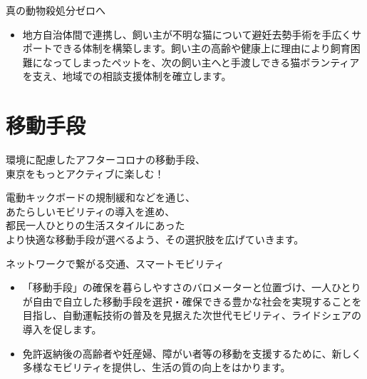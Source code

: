 \documentclass[dvipdfmx]{beamer}
\begin{document}
    \begin{frame}{真の動物殺処分ゼロへ}{}
        \begin{small}
            \begin{itemize}
                \setlength{\itemsep}{2mm}
                \item 地方自治体間で連携し、飼い主が不明な猫について避妊去勢手術を手広くサポートできる体制を構築します。飼い主の高齢や健康上に理由により飼育困難になってしまったペットを、次の飼い主へと手渡しできる猫ボランティアを支え、地域での相談支援体制を確立します。
            \end{itemize}
        \end{small}
    \end{frame}

\section{移動手段}
    \begin{frame}
        \sectionpage
        \begin{center}
            \begin{large}
                \alert{環境に配慮したアフターコロナの移動手段、}\\\alert{東京をもっとアクティブに楽しむ！}
            \end{large}
        \end{center}
        \begin{small}
            電動キックボードの規制緩和などを通じ、\\
            あたらしいモビリティの導入を進め、\\
            都民一人ひとりの生活スタイルにあった\\
            より快適な移動手段が選べるよう、その選択肢を広げていきます。
        \end{small}
    \end{frame}

    \begin{frame}{ネットワークで繋がる交通、スマートモビリティ}{}
        \begin{small}
            \begin{itemize}
                \setlength{\itemsep}{2mm}
                \item 「移動手段」の確保を暮らしやすさのバロメーターと位置づけ、一人ひとりが自由で自立した移動手段を選択・確保できる豊かな社会を実現することを目指し、自動運転技術の普及を見据えた次世代モビリティ、ライドシェアの導入を促します。
                \item 免許返納後の高齢者や妊産婦、障がい者等の移動を支援するために、新しく多様なモビリティを提供し、生活の質の向上をはかります。
            \end{itemize}
        \end{small}
    \end{frame}
\end{document}
